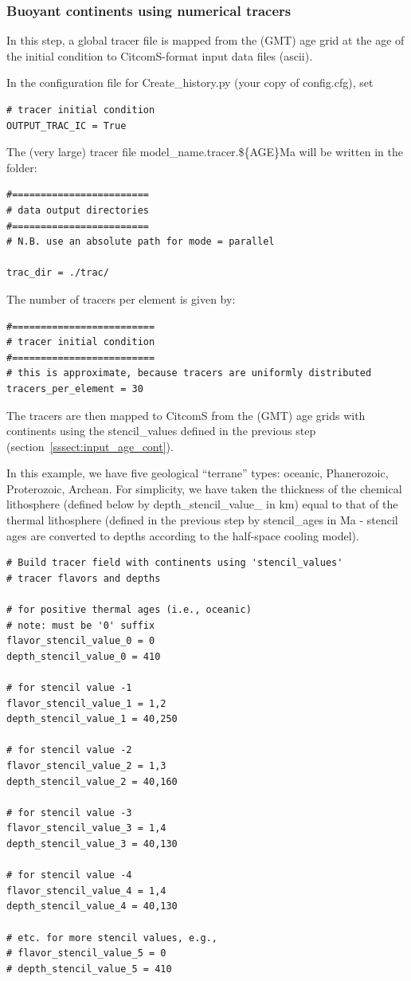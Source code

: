 \documentclass[letterpaper,12pt]{article}
\begin{document}
\subsubsection{Buoyant continents using numerical tracers}
\label{sssec:make_tracers}
In this step, a global tracer file is mapped from the (GMT) age grid at the age of the initial condition to CitcomS-format input data files (ascii).

In the configuration file for Create\_history.py (your copy of config.cfg), set

\begin{verbatim}
# tracer initial condition
OUTPUT_TRAC_IC = True
\end{verbatim}

The (very large) tracer file model\_name.tracer.\$\{AGE\}Ma will be written in the folder:

\begin{verbatim}
#========================
# data output directories
#========================
# N.B. use an absolute path for mode = parallel

trac_dir = ./trac/
\end{verbatim}

The number of tracers per element is given by: 

\begin{verbatim}
#=========================
# tracer initial condition
#=========================
# this is approximate, because tracers are uniformly distributed
tracers_per_element = 30
\end{verbatim}

The tracers are then mapped to CitcomS from the (GMT) age grids with continents using the stencil\_values defined in the previous step (section~\ref{sssect:input_age_cont}).

In this example, we have five geological ``terrane'' types: oceanic, Phanerozoic, Proterozoic, Archean.  For simplicity, we have taken the thickness of the chemical lithosphere (defined below by depth\_stencil\_value\_ in km) equal to that of the thermal lithosphere (defined in the previous step by stencil\_ages in Ma - stencil ages are converted to depths according to the half-space cooling model). 

\begin{verbatim}
# Build tracer field with continents using 'stencil_values'
# tracer flavors and depths

# for positive thermal ages (i.e., oceanic)
# note: must be '0' suffix
flavor_stencil_value_0 = 0
depth_stencil_value_0 = 410

# for stencil value -1
flavor_stencil_value_1 = 1,2
depth_stencil_value_1 = 40,250

# for stencil value -2
flavor_stencil_value_2 = 1,3
depth_stencil_value_2 = 40,160

# for stencil value -3
flavor_stencil_value_3 = 1,4
depth_stencil_value_3 = 40,130

# for stencil value -4
flavor_stencil_value_4 = 1,4
depth_stencil_value_4 = 40,130

# etc. for more stencil values, e.g.,
# flavor_stencil_value_5 = 0 
# depth_stencil_value_5 = 410
\end{verbatim}
\end{document}

